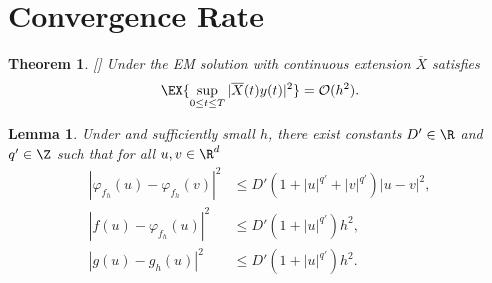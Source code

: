 \documentclass[sort&compress, preprint]{elsarticle}
\theoremstyle{definition}
\newtheorem{hypothesis}{Hypothesis}[section]
\theoremstyle{plain}%
\newtheorem{thm}{Theorem}[section]
\newtheorem{lem}{Lemma}[section]
\theoremstyle{remark}
\newcommand{\innerprod}[2]{\left\langle#1, #2\right\rangle}
\begin{document}
\section{Convergence Rate} 


\begin{thm}\label{thm:EulerConvergenceRateHMS}[{\citet[Thm 4.4]{Higham2002b}}]
	Under  the EM solution with continuous extension $\overline{X}$
	satisfies
	\begin{equation}
		\EX{
			\sup_{0\leq t \leq T}
			|\overline{X}(t) y(t)|^2
		} = \mathcal{O}(h^2).
	\end{equation}
\end{thm}
%
\begin{lem}
	Under  and sufficiently small $h$, there exist
	constants $D'\in \R$ and $q'\in \Z$ such that for all $u,v\in \R^d$
	\begin{align}
		|
			\varphi_{f_h}(u)
			-\varphi_{f_h}(v)
		|^2 
		&\leq
			D'
			\left(
				1 +|u|^{q'} +|v|^{q'}
			\right)
			|u-v|^2, \\
		|
			 f(u) -\varphi_{f_h}(u)
		|^2 
		&\leq
			D'
			\left(
				1 +|u|^{q'} 
				\right)
			h^2, \\
		|
			g(u) -g_h(u)
		|^2 				 
		&\leq
			D'
			\left(
				1 +|u|^{q'} 
			\right)
			h^2 . \label{eqn:ghPolyGrowth}
	\end{align}
\end{lem}
\end{document}
